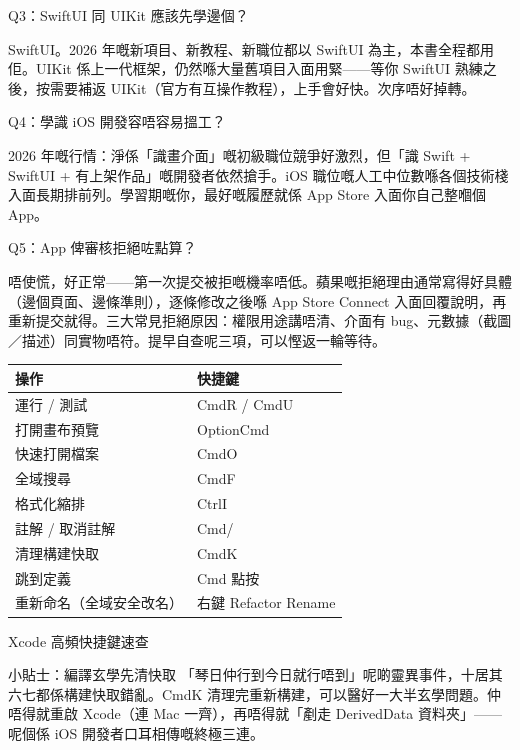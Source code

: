 Q3：SwiftUI 同 UIKit 應該先學邊個？

SwiftUI。2026 年嘅新項目、新教程、新職位都以 SwiftUI 為主，本書全程都用佢。UIKit 係上一代框架，仍然喺大量舊項目入面用緊——等你 SwiftUI 熟練之後，按需要補返 UIKit（官方有互操作教程），上手會好快。次序唔好掉轉。

Q4：學識 iOS 開發容唔容易搵工？

2026 年嘅行情：淨係「識畫介面」嘅初級職位競爭好激烈，但「識 Swift + SwiftUI + 有上架作品」嘅開發者依然搶手。iOS 職位嘅人工中位數喺各個技術棧入面長期排前列。學習期嘅你，最好嘅履歷就係 App Store 入面你自己整嗰個 App。

Q5：App 俾審核拒絕咗點算？

唔使慌，好正常——第一次提交被拒嘅機率唔低。蘋果嘅拒絕理由通常寫得好具體（邊個頁面、邊條準則），逐條修改之後喺 App Store Connect 入面回覆說明，再重新提交就得。三大常見拒絕原因：權限用途講唔清、介面有 bug、元數據（截圖／描述）同實物唔符。提早自查呢三項，可以慳返一輪等待。


\begin{center}
\begin{tabularx}{\linewidth}{|X|X|}
\hline
\textbf{操作} & \textbf{快捷鍵} \tabularnewline
\hline
運行 / 測試 & CmdR / CmdU \tabularnewline
打開畫布預覽 & OptionCmd \tabularnewline
快速打開檔案 & CmdO \tabularnewline
全域搜尋 & CmdF \tabularnewline
格式化縮排 & CtrlI \tabularnewline
註解 / 取消註解 & Cmd/ \tabularnewline
清理構建快取 & CmdK \tabularnewline
跳到定義 & Cmd 點按 \tabularnewline
重新命名（全域安全改名） & 右鍵 Refactor Rename \tabularnewline
\hline
\end{tabularx}
\end{center}

\begin{center}\small\color{gray}Xcode 高頻快捷鍵速查\end{center}

\begin{tcbinfo}{小貼士：編譯玄學先清快取}
「琴日仲行到今日就行唔到」呢啲靈異事件，十居其六七都係構建快取錯亂。CmdK 清理完重新構建，可以醫好一大半玄學問題。仲唔得就重啟 Xcode（連 Mac 一齊），再唔得就「剷走 DerivedData 資料夾」——呢個係 iOS 開發者口耳相傳嘅終極三連。

\end{tcbinfo}



